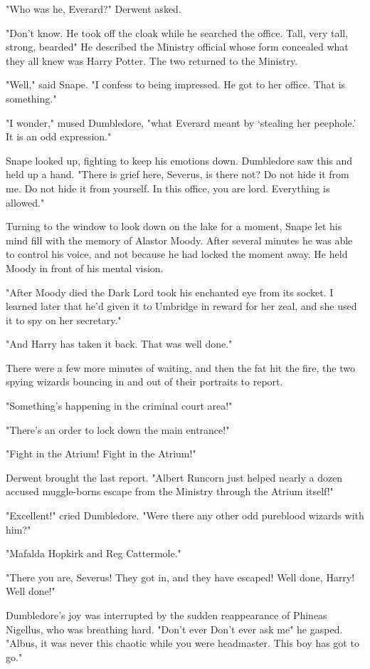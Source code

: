 "Who was he, Everard?" Derwent asked.

"Don't know. He took off the cloak while he searched the office. Tall, very tall, strong, bearded{\el}" He described the Ministry official whose form concealed what they all knew was Harry Potter. The two returned to the Ministry.

"Well," said Snape. "I confess to being impressed. He got to her office. That is something."

"I wonder," mused Dumbledore, "what Everard meant by `stealing her peephole.' It is an odd expression."

Snape looked up, fighting to keep his emotions down. Dumbledore saw this and held up a hand. "There is grief here, Severus, is there not? Do not hide it from me. Do not hide it from yourself. In this office, you are lord. Everything is allowed."

Turning to the window to look down on the lake for a moment, Snape let his mind fill with the memory of Alastor Moody. After several minutes he was able to control his voice, and not because he had locked the moment away. He held Moody in front of his mental vision.

"After Moody{\el} died{\el} the Dark Lord took his enchanted eye from its socket. I learned later that he'd given it to Umbridge in reward for her zeal, and she used it to spy on her secretary."

"And Harry has taken it back. That was well done."

There were a few more minutes of waiting, and then the fat hit the fire, the two spying wizards bouncing in and out of their portraits to report.

"Something's happening in the criminal court area!"

"There's an order to lock down the main entrance!"

"Fight in the Atrium! Fight in the Atrium!"

Derwent brought the last report. "Albert Runcorn just helped nearly a dozen accused muggle-borns escape from the Ministry through the Atrium itself!"

"Excellent!" cried Dumbledore. "Were there any other odd pureblood wizards with him?"

"Mafalda Hopkirk and Reg Cattermole."

"There you are, Severus! They got in, and they have escaped! Well done, Harry! Well done!"

Dumbledore's joy was interrupted by the sudden reappearance of Phineas Nigellus, who was breathing hard. "Don't ever{\el} Don't ever ask me{\el}" he gasped. "Albus, it was never this chaotic while you were headmaster. This boy has got to go."

